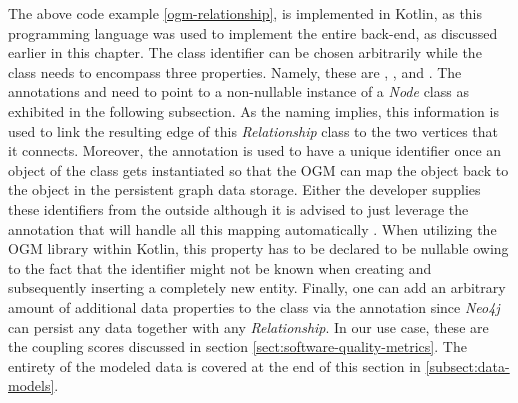 \documentclass[12pt,a4paper]{report}
\begin{document}
The above code example \ref{ogm-relationship}, is implemented in Kotlin,
as this programming language was used to implement the entire back-end,
as discussed earlier in this chapter.
The class identifier can be chosen arbitrarily while the class needs to
encompass three properties.
Namely, these are , , and .
The annotations  and  need to point
to a non-nullable instance of a \textit{Node} class as exhibited in the
following subsection. As the naming implies, this information is used
to link the resulting edge of this \textit{Relationship} class to the
two vertices that it connects.
Moreover, the  annotation is used to have a unique identifier
once an object of the class gets instantiated so that the OGM can map
the object back to the object in the persistent graph data storage.
Either the developer supplies these identifiers from the outside although
it is advised to just leverage the  annotation that
will handle all this mapping automatically \cite{neo4j-ogm}.
When utilizing the OGM library within Kotlin, this property has to be
declared to be nullable owing to the fact that the identifier might not
be known when creating and subsequently inserting a completely new entity.
Finally, one can add an arbitrary amount of additional data properties
to the class via the  annotation since \textit{Neo4j} can persist
any data together with any \textit{Relationship}. In our use case,
these are the coupling scores discussed in section \ref{sect:software-quality-metrics}.
The entirety of the modeled data is covered at the end of this section in
\ref{subsect:data-models}.
\end{document}
